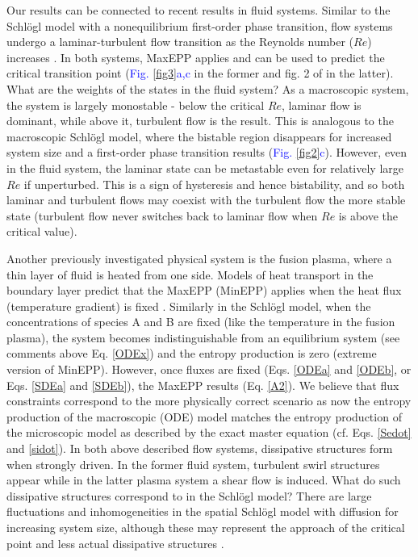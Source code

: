 \documentclass[aps,prl,reprint,singlecolumn,superscriptaddress]{revtex4}
\begin{document}
{Our results can be connected to recent results in fluid systems. Similar to the Schl\"ogl
model with a nonequilibrium first-order phase transition, flow systems undergo a  
laminar-turbulent flow transition as the Reynolds number ($Re$) increases \cite{martyushev07}. In both systems, MaxEPP applies and can be
used to predict the critical transition point (\textcolor{blue}{Fig. \ref{fig3}a,c} in the former and fig. 2 of \cite{martyushev07} in the latter). 
What are the weights of the states in the fluid system? As a macroscopic system, the system is largely monostable - below the 
critical $Re$, laminar flow is dominant, while above it, turbulent flow is the result. This is analogous to the
macroscopic Schl\"ogl model, where the bistable region disappears for increased system size and a first-order phase transition results 
(\textcolor{blue}{Fig. \ref{fig2}c}). 
However, even in the fluid system, the laminar state can be metastable even for relatively large $Re$ if unperturbed. This is a sign
of hysteresis and hence bistability, and so both laminar and turbulent flows may coexist with the turbulent flow the more
stable state (turbulent flow never switches back to laminar flow when $Re$ is above the critical value).

Another previously investigated physical system is the fusion plasma, where a thin layer of fluid is heated 
from one side. Models of heat transport in the boundary layer predict that the MaxEPP (MinEPP) applies when the heat flux 
(temperature gradient) is fixed \cite{yoshida08,kawazura10}. 
Similarly in the Schl\"ogl model, when the concentrations of species A and B are fixed (like the temperature in the fusion plasma), 
the system becomes indistinguishable from an equilibrium system (see comments
above Eq. \ref{ODEx}) and the entropy production is zero (extreme version of MinEPP). However, once fluxes are fixed 
(Eqs. \ref{ODEa} and \ref{ODEb}, or Eqs. \ref{SDEa} and \ref{SDEb}), the MaxEPP results (Eq. \ref{A2}). We believe that flux constraints correspond 
to the more physically correct scenario as now the entropy production of the macroscopic (ODE) model matches the entropy production of the microscopic model as 
described by the exact master equation (cf. Eqs. \ref{Sedot} and \ref{sidot}). 
In both above described flow systems, dissipative structures form when strongly driven. In the former fluid system, turbulent swirl structures appear 
while in the latter plasma system a shear flow is induced. What do such dissipative structures correspond to in the Schl\"ogl model? 
There are large fluctuations and inhomogeneities in the spatial Schl\"ogl model with diffusion for increasing system size, 
although these may represent the approach of the critical point and less actual dissipative structures \cite{endres15}.

}
\end{document}
